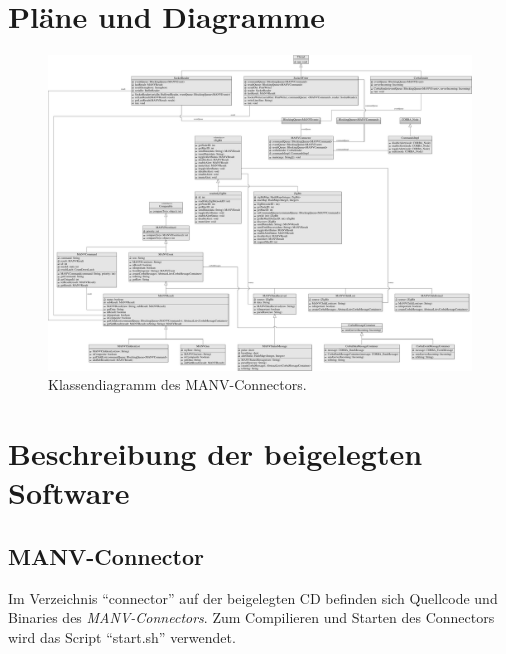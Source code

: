 
\chapter{Pläne und Diagramme}
    \begin{figure}
            \includegraphics*[width=1\textwidth]{uml_diagramme/manvconnector_uml.pdf}
            \caption{Klassendiagramm des MANV-Connectors.}
            \label{klassendiagramm_manvconnector}
    \end{figure}

\chapter{Beschreibung der beigelegten Software}\label{anhang_beschreibung_software}
    \section{MANV-Connector}

    Im Verzeichnis "`connector"' auf der beigelegten CD befinden sich
    Quellcode und Binaries des \emph{MANV-Connectors}. Zum Compilieren
    und Starten des Connectors wird das Script "`start.sh"' verwendet.

